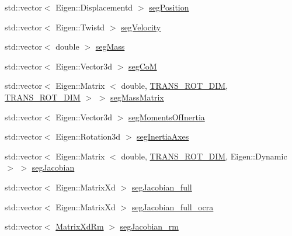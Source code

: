 \begin{DoxyCompactItemize}
\item 
std\-::vector$<$ \-Eigen\-::\-Displacementd $>$ \hyperlink{structOcraWbiModel_1_1OcraWbiModel__pimpl_a47b0a577b990fa7db3bc04a7a8107c31}{seg\-Position}
\item 
std\-::vector$<$ \-Eigen\-::\-Twistd $>$ \hyperlink{structOcraWbiModel_1_1OcraWbiModel__pimpl_a6e95ae9d994aa67c9a2fc4021f80bb54}{seg\-Velocity}
\item 
std\-::vector$<$ double $>$ \hyperlink{structOcraWbiModel_1_1OcraWbiModel__pimpl_a6cdb912e87fd9cea517e098615c8f945}{seg\-Mass}
\item 
std\-::vector$<$ \-Eigen\-::\-Vector3d $>$ \hyperlink{structOcraWbiModel_1_1OcraWbiModel__pimpl_af244a33c7309714ca793d29247ead8b8}{seg\-Co\-M}
\item 
std\-::vector$<$ \-Eigen\-::\-Matrix\*
$<$ double, \hyperlink{OcraWbiModel_8cpp_ab4a87cb824ceff256c6b8bce7701af58}{\-T\-R\-A\-N\-S\-\_\-\-R\-O\-T\-\_\-\-D\-I\-M}, \*
\hyperlink{OcraWbiModel_8cpp_ab4a87cb824ceff256c6b8bce7701af58}{\-T\-R\-A\-N\-S\-\_\-\-R\-O\-T\-\_\-\-D\-I\-M} $>$ $>$ \hyperlink{structOcraWbiModel_1_1OcraWbiModel__pimpl_a3d0cb4cfda4c6ce54020d61f5845dedb}{seg\-Mass\-Matrix}
\item 
std\-::vector$<$ \-Eigen\-::\-Vector3d $>$ \hyperlink{structOcraWbiModel_1_1OcraWbiModel__pimpl_a478fcde74e00dc9b8235bbe5a2c2cb75}{seg\-Moments\-Of\-Inertia}
\item 
std\-::vector$<$ \-Eigen\-::\-Rotation3d $>$ \hyperlink{structOcraWbiModel_1_1OcraWbiModel__pimpl_aba2d3ed2e0c2a1a1b8b4d40c3df6a4a5}{seg\-Inertia\-Axes}
\item 
std\-::vector$<$ \-Eigen\-::\-Matrix\*
$<$ double, \hyperlink{OcraWbiModel_8cpp_ab4a87cb824ceff256c6b8bce7701af58}{\-T\-R\-A\-N\-S\-\_\-\-R\-O\-T\-\_\-\-D\-I\-M}, \*
\-Eigen\-::\-Dynamic $>$ $>$ \hyperlink{structOcraWbiModel_1_1OcraWbiModel__pimpl_a3430097cc1a200a4ff5abcafd52a7d44}{seg\-Jacobian}
\item 
std\-::vector$<$ \-Eigen\-::\-Matrix\-Xd $>$ \hyperlink{structOcraWbiModel_1_1OcraWbiModel__pimpl_abdfc807c93bad49781c9ad0f1588b203}{seg\-Jacobian\-\_\-full}
\item 
std\-::vector$<$ \-Eigen\-::\-Matrix\-Xd $>$ \hyperlink{structOcraWbiModel_1_1OcraWbiModel__pimpl_ad4acb4942706d77c1dfd480132592ded}{seg\-Jacobian\-\_\-full\-\_\-ocra}
\item 
std\-::vector$<$ \hyperlink{namespaceocra__icub_aa5e36a19ed031c28ca83c207bd7dd83f}{\-Matrix\-Xd\-Rm} $>$ \hyperlink{structOcraWbiModel_1_1OcraWbiModel__pimpl_a08c7db0bf6de072dc07a5810311aba48}{seg\-Jacobian\-\_\-rm}

\end{DoxyCompactItemize}
